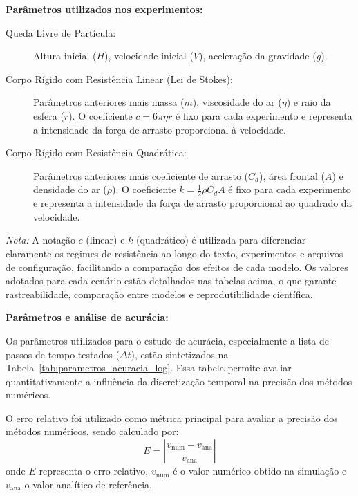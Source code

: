 \textbf{Parâmetros utilizados nos experimentos:}
\begin{description}
    \item[Queda Livre de Partícula:] Altura inicial ($H$), velocidade inicial ($V$), aceleração da gravidade ($g$).\\
    
    \label{tab:parametros_queda_livre}
    \item[Corpo Rígido com Resistência Linear (Lei de Stokes):] Parâmetros anteriores mais massa ($m$), viscosidade do ar ($\eta$) e raio da esfera ($r$). O coeficiente $c = 6\pi\eta r$ é fixo para cada experimento e representa a intensidade da força de arrasto proporcional à velocidade.\\
    
    \label{tab:parametros_linear}
    \item[Corpo Rígido com Resistência Quadrática:] Parâmetros anteriores mais coeficiente de arrasto ($C_d$), área frontal ($A$) e densidade do ar ($\rho$). O coeficiente $k = \frac{1}{2} \rho C_d A$ é fixo para cada experimento e representa a intensidade da força de arrasto proporcional ao quadrado da velocidade.\\
    
    \label{tab:parametros_quadratica}
\end{description}

\textit{Nota:} A notação $c$ (linear) e $k$ (quadrático) é utilizada para diferenciar claramente os regimes de resistência ao longo do texto, experimentos e arquivos de configuração, facilitando a comparação dos efeitos de cada modelo. Os valores adotados para cada cenário estão detalhados nas tabelas acima, o que garante rastreabilidade, comparação entre modelos e reprodutibilidade científica.

\textbf{Parâmetros e análise de acurácia:}


\noindent
Os parâmetros utilizados para o estudo de acurácia, especialmente a lista de passos de tempo testados ($\Delta t$), estão sintetizados na Tabela~\ref{tab:parametros_acuracia_log}. Essa tabela permite avaliar quantitativamente a influência da discretização temporal na precisão dos métodos numéricos.
\label{tab:parametros_acuracia_log}

O erro relativo foi utilizado como métrica principal para avaliar a precisão dos métodos numéricos, sendo calculado por:
\begin{equation}
    E = \left| \frac{v_{\text{num}} - v_{\text{ana}}}{v_{\text{ana}}} \right|
\end{equation}
onde $E$ representa o erro relativo, $v_{\text{num}}$ é o valor numérico obtido na simulação e $v_{\text{ana}}$ o valor analítico de referência.

